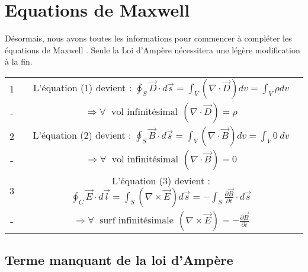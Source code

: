 \section{Equations de Maxwell}
Désormais, nous avons toutes les informations pour commencer à compléter les équations de Maxwell . 
Seule la Loi d'Ampère nécessitera une légère modification à la fin.

\begin{center}

\begin{tabular}{|c|c|}

\hline

1 & L'équation (1) devient : $ \oint_{S} \vec{D} \cdot d\vec{s}  =  \int_{V} (\nabla \cdot \vec{D} ) dv =  \int_{V} \rho dv$ \\  
- & $\Rightarrow \forall  \hspace{3pt} \mbox{ vol infinitésimal} \hspace{5pt} (\nabla \cdot \vec{D} ) = \rho$  \\

\hline

2 & L'équation (2) devient : $ \oint_{S} \vec{B} \cdot d\vec{s}  =  \int_{V} (\nabla \cdot \vec{B} ) dv =  \int_{V} 0 \:dv$ \\ 
- & $\Rightarrow \forall  \hspace{3pt} \mbox{ vol infinitésimal} \hspace{5pt} (\nabla \cdot \vec{B} ) = 0 $ \\

\hline

3 & L'équation (3) devient : $   \oint_{C} \vec{E} \cdot d\vec{l} = \int_{S} (\nabla \times \vec{E}) d\vec{s}= -\int_{S} \frac{\partial \vec{B}}{\partial t} \cdot d\vec{s}$ \\  
- &$ \Rightarrow \forall  \hspace{3pt} \mbox{ surf infinitésimale} \hspace{5pt} (\nabla \times \vec{E} ) = -\frac{\partial \vec{B}}{\partial t}$\\

\hline

\end{tabular}

\end{center}

\subsection{Terme manquant de la loi d'Ampère}

